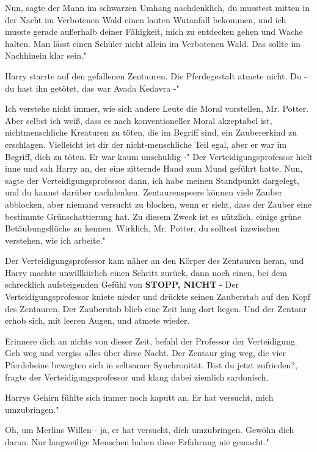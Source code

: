 \glqq Nun\grqq{}, sagte der Mann im schwarzen Umhang nachdenklich, \glqq du
musstest mitten in der Nacht im Verbotenen Wald einen lauten Wutanfall bekommen,
und ich musste gerade außerhalb deiner Fähigkeit, mich zu entdecken gehen und
Wache halten. Man lässt einen Schüler nicht allein im Verbotenen Wald. Das
sollte im Nachhinein klar sein."

Harry starrte auf den gefallenen Zentauren. Die Pferdegestalt atmete nicht.
\glqq Du - du hast ihn getötet, das war Avada Kedavra -"

\glqq Ich verstehe nicht immer, wie sich andere Leute die Moral vorstellen, Mr.
Potter. Aber selbst ich weiß, dass es nach konventioneller Moral akzeptabel ist,
nichtmenschliche Kreaturen zu töten, die im Begriff sind, ein Zaubererkind zu
erschlagen. Vielleicht ist dir der nicht-menschliche Teil egal, aber er war im
Begriff, dich zu töten. Er war kaum unschuldig -" Der Verteidigungsprofessor
hielt inne und sah Harry an, der eine zitternde Hand zum Mund geführt hatte.
\glqq Nun\grqq{}, sagte der Verteidigungsprofessor dann, \glqq ich habe meinen
Standpunkt dargelegt, und du kannst darüber nachdenken. Zentaurenspeere können
viele Zauber abblocken, aber niemand versucht zu blocken, wenn er sieht, dass
der Zauber eine bestimmte Grünschattierung hat. Zu diesem Zweck ist es nützlich,
einige grüne Betäubungsflüche zu kennen. Wirklich, Mr. Potter, du solltest
inzwischen verstehen, wie ich arbeite."

Der Verteidigungsprofessor kam näher an den Körper des Zentauren heran, und
Harry machte unwillkürlich einen Schritt zurück, dann noch einen, bei dem
schrecklich aufsteigenden Gefühl von \textbf{STOPP, NICHT} - Der
Verteidigungsprofessor kniete nieder und drückte seinen Zauberstab auf den Kopf
des Zentauren. Der Zauberstab blieb eine Zeit lang dort liegen. Und der Zentaur
erhob sich, mit leeren Augen, und atmete wieder.

\glqq Erinnere dich an nichts von dieser Zeit\grqq{}, befahl der Professor der
Verteidigung. \glqq Geh weg und vergiss alles über diese Nacht.\grqq{} Der
Zentaur ging weg, die vier Pferdebeine bewegten sich in seltsamer Synchronität.
\glqq Bist du jetzt zufrieden?\grqq{}, fragte der Verteidigungsprofessor und
klang dabei ziemlich sardonisch.

Harrys Gehirn fühlte sich immer noch kaputt an. \glqq Er hat versucht, mich
umzubringen."

\glqq Oh, um Merlins Willen - ja, er hat versucht, dich umzubringen. Gewöhn dich
daran. Nur langweilige Menschen haben diese Erfahrung nie gemacht."

